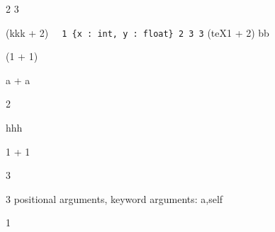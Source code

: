  2 3
 


\begin{center}
(kkk + 2)
\Verb&  1 {x : int, y : float} 2 3 3&
(teX1 + 2)
\a bb  


(1 + 1)
\end{center}
a + a

2


hhh

1 + 1



3

3 positional arguments, keyword arguments: { a,self }


1